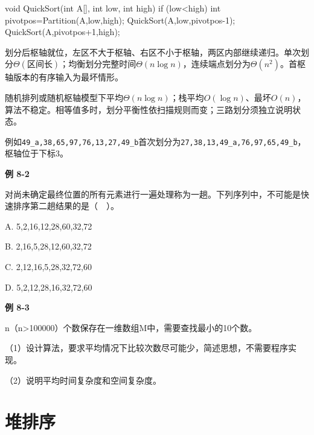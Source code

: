 \par\smallskip\noindent\begin{minipage}{\linewidth}
\begin{codeblock}[language={C++}]
void QuickSort(int A[], int low, int high) {
    if (low<high) {
        int pivotpos=Partition(A,low,high);
        QuickSort(A,low,pivotpos-1);
        QuickSort(A,pivotpos+1,high);
    }
}
\end{codeblock}
\end{minipage}\par\smallskip

划分后枢轴就位，左区不大于枢轴、右区不小于枢轴，两区内部继续递归。单次划分\(\Theta(区间长)\)；均衡划分完整时间\(\Theta(n\log n)\)，连续端点划分为\(\Theta(n^2)\)。首枢轴版本的有序输入为最坏情形。

随机排列或随机枢轴模型下平均\(\Theta(n\log n)\)；栈平均\(O(\log n)\)、最坏\(O(n)\)，算法不稳定。相等值多时，划分平衡性依扫描规则而变；三路划分须独立说明状态。

例如\texttt{49\_a,\allowbreak{}38,\allowbreak{}65,\allowbreak{}97,\allowbreak{}76,\allowbreak{}13,\allowbreak{}27,\allowbreak{}49\_b}首次划分为\texttt{27,\allowbreak{}38,\allowbreak{}13,\allowbreak{}49\_a,\allowbreak{}76,\allowbreak{}97,\allowbreak{}65,\allowbreak{}49\_b}，枢轴位于下标3。

\par\medskip{}\noindent\hypertarget{DS08-E02}{}\label{DS08-E02}\textbf{例 8-2}\par\nobreak\smallskip

对尚未确定最终位置的所有元素进行一遍处理称为一趟。下列序列中，不可能是快速排序第二趟结果的是（　）。

A. 5,2,16,12,28,60,32,72

B. 2,16,5,28,12,60,32,72

C. 2,12,16,5,28,32,72,60

D. 5,2,12,28,16,32,72,60

\par\medskip{}\noindent\hypertarget{DS08-E09}{}\label{DS08-E09}\textbf{例 8-3}\par\nobreak\smallskip

n（n\textgreater100000）个数保存在一维数组M中，需要查找最小的10个数。

（1）设计算法，要求平均情况下比较次数尽可能少，简述思想，不需要程序实现。

（2）说明平均时间复杂度和空间复杂度。

\section{堆排序}\label{DS08-heap}

